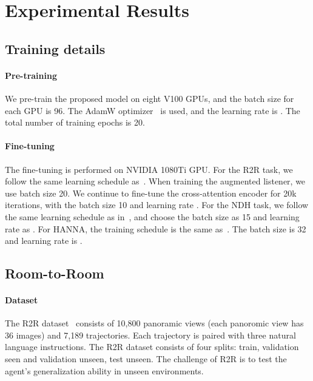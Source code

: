 \documentclass[10pt,twocolumn,letterpaper]{article}
\begin{document}
\section{Experimental Results}

\subsection{Training details}
\paragraph{Pre-training} 
We pre-train the proposed model on eight V100 GPUs, and the batch size for each GPU is 96. The AdamW optimizer~\cite{kingma2014adam} is used, and the learning rate is . The total number of training epochs is 20.

\paragraph{Fine-tuning} The fine-tuning is performed on NVIDIA 1080Ti GPU.
For the R2R task, we follow the same learning schedule as~\cite{tan2019learning}. When training the augmented listener, we use batch size 20. We continue to fine-tune the cross-attention encoder for 20k iterations, with the batch size 10 and learning rate . 
For the NDH task, we follow the same learning schedule as in~\cite{thomason2019vision}, and choose the batch size as 15 and learning rate as . 
For HANNA, the training schedule is the same as~\cite{nguyen2019help}. The batch size is 32 and learning rate is . 



\subsection{Room-to-Room}
\paragraph{Dataset} The R2R dataset~\cite{anderson2018vision} consists of 10,800 panoramic views (each panoromic view has 36 images) and 7,189 trajectories. Each trajectory is paired with three natural language instructions. The R2R dataset consists of four splits: train, validation seen and validation unseen, test unseen. The challenge of R2R is to test the agent's generalization ability in unseen environments. 
\end{document}
